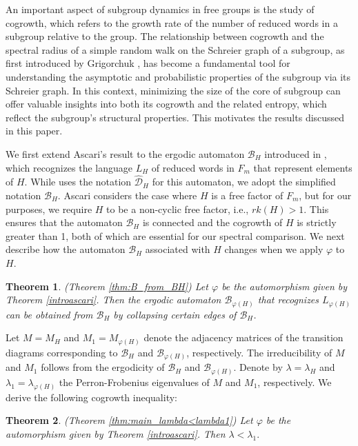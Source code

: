\documentclass{article}
\newtheorem{introthm}{Theorem}
\newcommand{\D}{\mathcal{D}}
\newcommand{\B}{\mathcal{B}}
\begin{document}
An important aspect of subgroup dynamics in free groups is the study of cogrowth, which refers to the growth rate of the number of reduced words in a subgroup relative to the group. The relationship between cogrowth and the spectral radius of a simple random walk on the Schreier graph of a subgroup, as first introduced by Grigorchuk \cite{MR599539Gri1980}, has become a fundamental tool for understanding the asymptotic and probabilistic properties of the subgroup via its Schreier graph. In this context, minimizing the size of the core of subgroup can offer valuable insights into both its cogrowth and the related entropy, which reflect the subgroup's structural properties. This motivates the results discussed in this paper.

We first extend Ascari’s result to the ergodic automaton $\B_H$ introduced in \cite{DGS2021}, which recognizes the language $L_H$ of reduced words in $F_m$ that represent elements of $H$. While \cite{DGS2021} uses the notation $\widehat{\D}_H$ for this automaton, we adopt the simplified notation $\B_H$. Ascari considers the case where $H$ is a free factor of $F_m$, but for our purposes, we require $H$ to be a non-cyclic free factor, i.e., $rk(H) > 1$. This ensures that the automaton $\B_H$ is connected and the cogrowth of $H$ is strictly greater than 1, both of which are essential for our spectral comparison. We next describe how the automaton $\B_H$ associated with $H$ changes when we apply $\varphi$ to $H$.

\begin{introthm}\label{introshai1} \textnormal{(Theorem \ref{thm:B_from_BH})}
Let $\varphi$ be the automorphism given by Theorem \ref{introascari}. Then the ergodic automaton $\B_{\varphi(H)}$ that recognizes $L_{\varphi(H)}$ can be obtained from $\B_H$ by collapsing certain edges of $\B_H$.
\end{introthm}

Let $M = M_H$ and $M_1 = M_{\varphi(H)}$ denote the adjacency matrices of the transition diagrams corresponding to $\B_H$ and $\B_{\varphi(H)}$, respectively. The irreducibility of $M$ and $M_1$ follows from the ergodicity of $\B_H$ and $\B_{\varphi(H)}$. Denote by $\lambda = \lambda_H$ and $\lambda_1 = \lambda_{\varphi(H)}$ the Perron-Frobenius eigenvalues of $M$ and $M_1$, respectively. We derive the following cogrowth inequality: 

\begin{introthm}\label{introshai2} \textnormal{(Theorem \ref{thm:main_lambda<lambda1})}
Let $\varphi$ be the automorphism given by Theorem \ref{introascari}. Then $\lambda < \lambda_1.$ 
\end{introthm}
\end{document}
